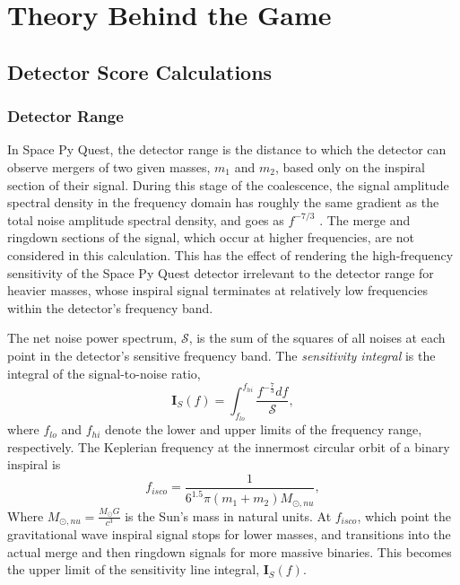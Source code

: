 \documentclass{article}
\begin{document}
\section{Theory Behind the Game}
\label{sec:theory}
\subsection{Detector Score Calculations}
\subsubsection{Detector Range}
In Space Py Quest, the detector range is the distance to which the
detector can observe mergers of two given masses, $m_1$ and $m_2$,
based only on the inspiral section of their signal. During this stage
of the coalescence, the signal amplitude spectral density in the
frequency domain has roughly the same gradient as the total noise
amplitude spectral density, and goes as $f^{-7/3}$ \cite{ajith}. The
merge and ringdown sections of the signal, which occur at higher
frequencies, are not considered in this calculation. This has the
effect of rendering the high-frequency sensitivity of the Space Py
Quest detector irrelevant to the detector range for heavier masses,
whose inspiral signal terminates at relatively low frequencies within
the detector's frequency band.

The net noise power spectrum, $\mathcal{S}$, is the sum of the squares
of all noises at each point in the detector's sensitive frequency
band.
    The \textit{sensitivity integral} is the integral of the signal-to-noise ratio,
    \[
    \mathbf{I}_S(f) = \int_{f_{lo}}^{f_{hi}} \frac{f^{-\frac{7}{3}}df}{\mathcal{S}},
    \]
    where $f_{lo}$ and $f_{hi}$ denote the lower and upper limits of the frequency range, respectively.
    The Keplerian frequency at the innermost circular orbit of a binary inspiral is
    \begin{equation}
    \label{eq:isco}
    f_{isco} = \frac{1}{6^{1.5}\pi(m_1+m_2)M_{\odot,nu}},
    \end{equation}
    Where $M_{\odot,nu} = \frac{M_{\odot}G}{c^3}$ is the Sun's mass in
    natural units. At $f_{isco}$, which point the gravitational wave
    inspiral signal stops for lower masses, and transitions into the
    actual merge and then ringdown signals for more massive
    binaries. This becomes the upper limit of the sensitivity line
    integral, $\mathbf{I}_S(f)$.
\end{document}
